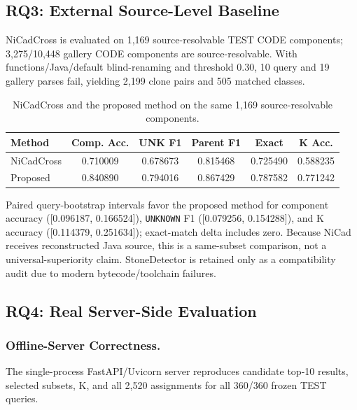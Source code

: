 \documentclass[runningheads]{llncs}
\begin{document}
\subsection{RQ3: External Source-Level Baseline}
NiCadCross is evaluated on 1,169 source-resolvable TEST CODE components; 3,275/10,448 gallery CODE components are source-resolvable. With functions/Java/default blind-renaming and threshold 0.30, 10 query and 19 gallery parses fail, yielding 2,199 clone pairs and 505 matched classes.
\begin{table}[!htbp]
\centering
\caption{NiCadCross and the proposed method on the same 1,169 source-resolvable components.}
\label{tab:nicad}
\scriptsize
\begin{tabular}{lccccc}
\toprule
Method & Comp. Acc. & UNK F1 & Parent F1 & Exact & K Acc.\\
\midrule
NiCadCross & 0.710009 & 0.678673 & 0.815468 & 0.725490 & 0.588235\\
Proposed & 0.840890 & 0.794016 & 0.867429 & 0.787582 & 0.771242\\
\bottomrule
\end{tabular}
\end{table}
Paired query-bootstrap intervals favor the proposed method for component accuracy ([0.096187, 0.166524]), \texttt{UNKNOWN} F1 ([0.079256, 0.154288]), and K accuracy ([0.114379, 0.251634]); exact-match delta includes zero. Because NiCad receives reconstructed Java source, this is a same-subset comparison, not a universal-superiority claim. StoneDetector is retained only as a compatibility audit due to modern bytecode/toolchain failures.

\subsection{RQ4: Real Server-Side Evaluation}
\subsubsection{Offline-Server Correctness.}
The single-process FastAPI/Uvicorn server reproduces candidate top-10 results, selected subsets, K, and all 2,520 assignments for all 360/360 frozen TEST queries.
\end{document}
